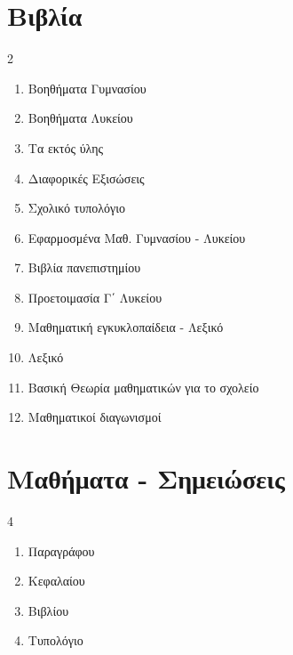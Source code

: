 \documentclass[11pt,a4paper]{article}
\begin{document}
\section{Βιβλία}
\begin{multicols}{2}
\begin{enumerate}[label=\thesection.\arabic*]
\item Βοηθήματα Γυμνασίου
\item Βοηθήματα Λυκείου
\item Τα εκτός ύλης
\item Διαφορικές Εξισώσεις
\item Σχολικό τυπολόγιο
\item Εφαρμοσμένα Μαθ. Γυμνασίου - Λυκείου
\item Βιβλία πανεπιστημίου
\item Προετοιμασία Γ΄ Λυκείου
\item Μαθηματική εγκυκλοπαίδεια - Λεξικό
\item Λεξικό
\item Βασική Θεωρία μαθηματικών για το σχολείο
\item Μαθηματικοί διαγωνισμοί
\end{enumerate}
\end{multicols}
\section{Μαθήματα - Σημειώσεις}
\begin{multicols}{4}
\begin{enumerate}[label=\thesection.\arabic*]
\item Παραγράφου
\item Κεφαλαίου
\item Βιβλίου
\item Τυπολόγιο
\end{enumerate}
\end{multicols}
\end{document}
